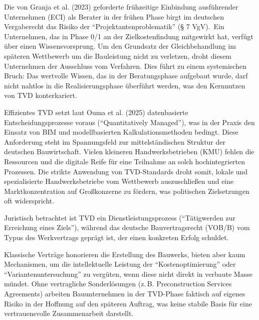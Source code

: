 Die von Granja et al. (2023) geforderte frühzeitige Einbindung ausführender Unternehmen (\acs{ECI}) als Berater in der frühen Phase birgt im deutschen Vergaberecht das Risiko der \enquote{Projektantenproblematik} (§ 7 VgV).\autocite[Vgl.][S.~2]{granja_modelo_2023}\, \autocite[Vgl.][§ 7]{vgv_verordnung_2016}
Ein Unternehmen, das in Phase 0/1 an der Zielkostenfindung mitgewirkt hat, verfügt über einen Wissensvorsprung. Um den Grundsatz der Gleichbehandlung im späteren Wettbewerb um die Bauleistung nicht zu verletzen, droht diesem Unternehmen der Ausschluss vom Verfahren. Dies führt zu einem systemischen Bruch: Das wertvolle Wissen, das in der Beratungsphase aufgebaut wurde, darf nicht nahtlos in die Realisierungsphase überführt werden, was den Kernnutzen von \acs{TVD} konterkariert.

Effizientes \acs{TVD} setzt laut Ouma et al. (2025) datenbasierte Entscheidungsprozesse voraus (\enquote{Quantitatively Managed}), was in der Praxis den Einsatz von \acs{BIM} und modellbasierten Kalkulationsmethoden bedingt.\autocite[Vgl.][S.~206 f]{ouma_target_2025}
Diese Anforderung steht im Spannungsfeld zur mittelständischen Struktur der deutschen Bauwirtschaft. Vielen kleineren Handwerksbetrieben (\acs{KMU}) fehlen die Ressourcen und die digitale Reife für eine Teilnahme an solch hochintegrierten Prozessen. Die strikte Anwendung von \acs{TVD}-Standards droht somit, lokale und spezialisierte Handwerksbetriebe vom Wettbewerb auszuschließen und eine Marktkonzentration auf Großkonzerne zu fördern, was politischen Zielsetzungen oft widerspricht.

Juristisch betrachtet ist \acs{TVD} ein Dienstleistungsprozess (\enquote{Tätigwerden zur Erreichung eines Ziels}), während das deutsche Bauvertragsrecht (\acs{VOB}/B) vom Typus des Werkvertrags geprägt ist, der einen konkreten Erfolg schuldet.\autocite[Vgl.][§~631]{noauthor_burgerliches_1900}\, \autocite[Vgl.][§~1]{vobb_din_2016}

Klassische Verträge honorieren die Erstellung des Bauwerks, bieten aber kaum Mechanismen, um die intellektuelle Leistung der \enquote{Kostenoptimierung} oder \enquote{Variantenuntersuchung} zu vergüten, wenn diese nicht direkt in verbaute Masse mündet. Ohne vertragliche Sonderlösungen (z.\,B. Preconstruction Services Agreements) arbeiten Bauunternehmen in der \acs{TVD}-Phase faktisch auf eigenes Risiko in der Hoffnung auf den späteren Auftrag, was keine stabile Basis für eine vertrauensvolle Zusammenarbeit darstellt.


